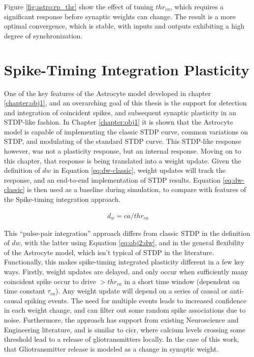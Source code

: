 Figure \ref{fig:astro:rp_thr} show the effect of tuning $thr_{ca}$, which
requires a significant \ca response before synaptic weights can change. The
result is a more optimal convergence, which is stable, with inputs and outputs
exhibiting a high degree of synchronization.


\section{Spike-Timing Integration Plasticity}

One of the key features of the Astrocyte model developed in chapter
\ref{chapter:obj1}, and an overarching goal of this thesis is the support for
detection and integration of coincident spikes, and subsequent synaptic
plasticity in an STDP-like fashion. In Chapter \ref{chapter:obj1} it is shown
that the Astrocyte model is capable of
implementing the classic STDP curve, common variations on STDP, and modulating
of the standard STDP curve. This STDP-like response however, was not a
plasticity response, but an internal \ca response. Moving on to this chapter,
that \ca response is being translated into a weight update. Given the definition
of $dw$ in Equation \ref{eq:dw-classic}, weight updates will track the \ca
response, and an end-to-end implementation of STDP results. Equation
\ref{eq:dw-classic} is then used as a baseline during simulation, to compare
with features of the Spike-timing integration approach.

\begin{align}
  d_w = ca / thr_{ca}  \label{eq:dw-classic}
\end{align}

This ``pulse-pair integration'' approach differs from classic STDP in the
definition of $dw$, with the latter using Equation \ref{eq:obj2:dw}, and in the
general flexibility of the Astrocyte model, which isn't typical of STDP in the
literature. Functionally, this makes spike-timing integrated plasticity different
in a few key ways. Firstly, weight updates are delayed, and
only occur when sufficiently many coincident spike occur to drive \ca
$>thr_{ca}$ in a short time window (dependent on time constant $\tau_{ca}$). Any
weight update will depend on a series of 
causal or anti-causal spiking events. The need for multiple events leads to 
increased confidence in each weight change, and can filter out some random spike
associations due to noise.  Furthermore, the approach has support from existing
Neuroscience and Engineering literature, and is similar to \Gls{cicr}, where calcium
levels crossing some threshold lead to a release of gliotransmitters locally. In
the case of this work, that Gliotransmitter release is modeled as a change in
synaptic weight.

